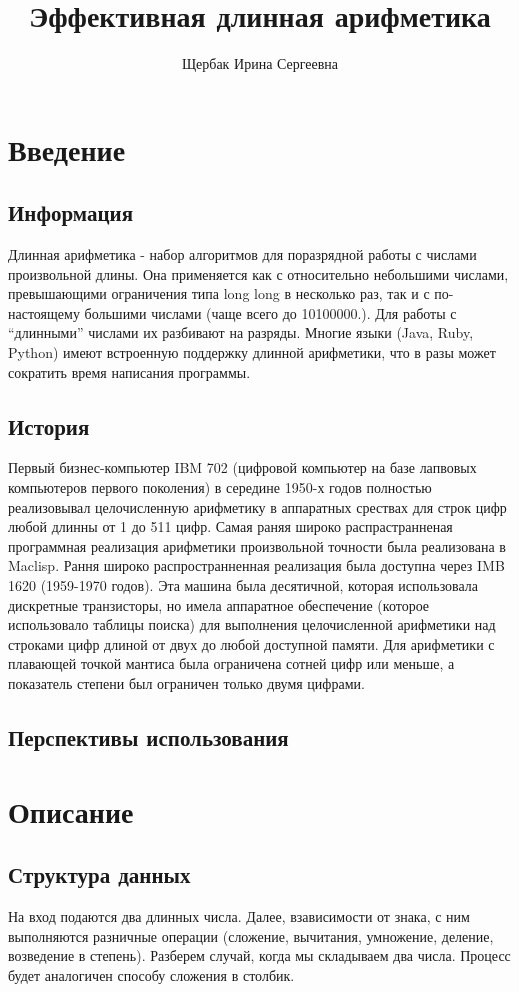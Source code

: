 \documentclass{article}
\title{Эффективная длинная арифметика}
\author{Щербак Ирина Сергеевна }
\begin{document}
\maketitle
\newpage

\section{Введение}
\subsection{Информация}
Длинная арифметика - набор алгоритмов для поразрядной работы с числами произвольной длины. Она применяется как с относительно небольшими числами, превышающими ограничения типа long long в несколько раз, так и с по-настоящему большими числами (чаще всего до 10100000.). Для работы с “длинными” числами их разбивают на разряды.
Многие языки (Java, Ruby, Python) имеют встроенную поддержку длинной арифметики, что в разы может сократить время написания программы.
\subsection{История}
Первый бизнес-компьютер IBM 702 (цифровой компьютер на базе лапвовых компьютеров первого поколения) в середине 1950-х годов полностью реализовывал целочисленную арифметику в аппаратных срествах для строк цифр любой длинны от 1 до 511 цифр. Самая раняя широко распрастранненая программная реализация арифметики произвольной точности была реализована в Maclisp. 
Рання широко распространненная реализация была доступна через IMB 1620 (1959-1970 годов). Эта машина была десятичной, которая использовала дискретные транзисторы, но имела аппаратное обеспечение (которое использовало таблицы поиска) для выполнения целочисленной арифметики над строками цифр длиной от двух до любой доступной памяти. Для арифметики с плавающей точкой мантиса была ограничена сотней цифр или меньше, а показатель степени был ограничен только двумя цифрами. 
\subsection{Перспективы использования}
\newpage

\section{Описание}
\subsection{Структура данных}
На вход подаются два длинных числа. Далее, взависимости от знака, с ним выполняются разничные операции (сложение, вычитания, умножение, деление, возведение в степень).
Разберем случай, когда мы складываем два числа. Процесс будет аналогичен способу сложения в столбик.
\newpage
\end{document}
